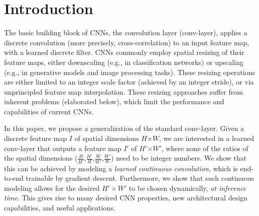 \section{Introduction}

The basic building block of CNNs, the convolution layer (conv-layer), applies a discrete convolution (more precisely, cross-correlation) to an input feature map, with a learned discrete filter.
CNNs commonly employ spatial resizing of their feature maps, either downscaling (e.g., in classification networks) or upscaling (e.g., in generative models and image processing tasks). These resizing operations are either limited to an integer scale factor (achieved by an integer stride), or via unprincipled feature map interpolation. These resizing approaches suffer from inherent problems (elaborated below), which limit the performance and capabilities of current CNNs.


In this paper, we propose a generalization of the standard conv-layer. 
Given a discrete feature map $I$ of 
spatial dimensions  $H$$\times$$W$,
we are interested in a learned conv-layer that outputs a feature map $I'$ of $H'$$\times$$W'$, 
where none of the ratios of the spatial dimensions ($\frac{H}{H'}$,$\frac{H'}{H}$,$\frac{W}{W'}$,$\frac{W'}{W}$)
need to be integer numbers. We show that this can be achieved by modeling a \emph{learned continuous convolution}, which is end-to-end trainable by gradient descent. Furthermore, we show that such continuous modeling  allows for the desired  $H' \times W'$  to be chosen dynamically, \emph{at inference time}. This gives rise to many desired CNN properties, new architectural design capabilities, and useful applications. 

